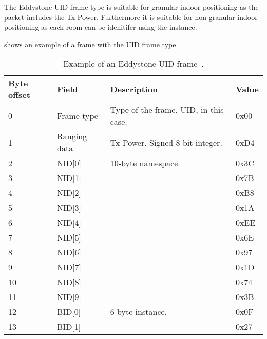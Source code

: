 The Eddystone-UID frame type is suitable for granular indoor positioning as the packet includes the Tx Power. Furthermore it is suitable for non-granular indoor positioning as each room can be idenitifer using the instance.

 shows an example of a frame with the UID frame type.

\begin{table}[h!]
\centering
\caption{Example of an Eddystone-UID frame~\cite{eddystone:protocol-uid-spec}.}
\label{tbl:design:ble-positioning:eddystone-uid}
\begin{tabular}{llll}
\textbf{Byte offset} & \textbf{Field} & \textbf{Description}                  & \textbf{Value} \\
0                    & Frame type     & Type of the frame. UID, in this case. & 0x00           \\
1                    & Ranging data   & Tx Power. Signed 8-bit integer.       & 0xD4           \\
2                    & NID{[}0{]}     & 10-byte namespace.                    & 0x3C           \\
3                    & NID{[}1{]}     &                                       & 0x7B           \\
4                    & NID{[}2{]}     &                                       & 0xB8           \\
5                    & NID{[}3{]}     &                                       & 0x1A           \\
6                    & NID{[}4{]}     &                                       & 0xEE           \\
7                    & NID{[}5{]}     &                                       & 0x6E           \\
8                    & NID{[}6{]}     &                                       & 0x97           \\
9                    & NID{[}7{]}     &                                       & 0x1D           \\
10                   & NID{[}8{]}     &                                       & 0x74           \\
11                   & NID{[}9{]}     &                                       & 0x3B           \\
12                   & BID{[}0{]}     & 6-byte instance.                      & 0x0F           \\
13                   & BID{[}1{]}     &                                       & 0x27           \\

\end{tabular}
\end{table}
